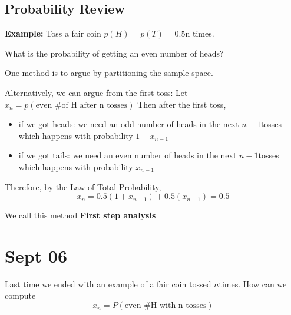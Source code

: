 \documentclass[12pt]{report}
\begin{document}
    \begin{center}
    \end{center}

\subsection*{Probability Review}
    \textbf{Example:} Toss a fair coin $p(H) = p(T) = 0.5$n times. 

    What is the probability of getting an even number of heads? 

    One method is to argue by partitioning the sample space. 

    Alternatively, we can argue from the first toss: Let $x_n = p(\text{even \# of H after n tosses})$ Then after the first toss, 
    \begin{itemize}
        \item if we got heads: we need an odd number of heads in the next $n-1$tosses which happens with probability $1 - x_{n-1}$
        \item if we got tails: we need an even number of heads in the next $n-1$tosses which happens with probability $x_{n-1}$
    \end{itemize}

    Therefore, by the Law of Total Probability, 
    \[x_n = 0.5(1 + x_{n-1}) + 0.5(x_{n-1}) = 0.5\]
    
    We call this method \textbf{First step analysis}

\section{Sept 06}
    Last time we ended with an example of a fair coin tossed $n$times. How can we compute 
    \[x_n = P(\text{even \# H with n tosses})\]
\end{document}

